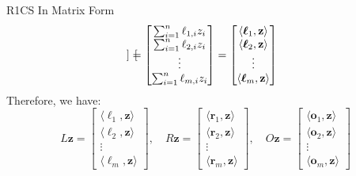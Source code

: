 \documentclass{zkdl-presentation-template}
\begin{document}
\begin{frame}{R1CS In Matrix Form}
{\begin{equation*}
\begin{bmatrix}
            \end{bmatrix} = \begin{bmatrix}
                \sum_{i=1}^{n}\ell_{1,i}z_i \\ \sum_{i=1}^{n}\ell_{2,i}z_i \\ \vdots \\ \sum_{i=1}^{n}\ell_{m,i}z_i
            \end{bmatrix} = \begin{bmatrix}
                \langle \boldsymbol{\ell}_1, \mathbf{z}\rangle \\
                \langle \boldsymbol{\ell}_2, \mathbf{z}\rangle \\
                \vdots \\
                \langle \boldsymbol{\ell}_m, \mathbf{z}\rangle 
            \end{bmatrix}
            \vspace{-5pt}
        \end{equation*}}
        \pause
        Therefore, we have:
        \vspace{-5pt}
        {\scriptsize \begin{equation*}
            L\mathbf{z} = \begin{bmatrix}
                \langle \boldsymbol{\ell}_1, \mathbf{z}\rangle \\
                \langle \boldsymbol{\ell}_2, \mathbf{z}\rangle \\
                \vdots \\
                \langle \boldsymbol{\ell}_m, \mathbf{z}\rangle 
            \end{bmatrix}, \quad
            R\mathbf{z} = \begin{bmatrix}
                \langle \boldsymbol{r}_1, \mathbf{z}\rangle \\
                \langle \boldsymbol{r}_2, \mathbf{z}\rangle \\
                \vdots \\
                \langle \boldsymbol{r}_m, \mathbf{z}\rangle 
            \end{bmatrix}, \quad
            O\mathbf{z} = \begin{bmatrix}
                \langle \boldsymbol{o}_1, \mathbf{z}\rangle \\
                \langle \boldsymbol{o}_2, \mathbf{z}\rangle \\
                \vdots \\
                \langle \boldsymbol{o}_m, \mathbf{z}\rangle 

\end{bmatrix}
\end{equation*}}
\end{frame}
\end{document}
